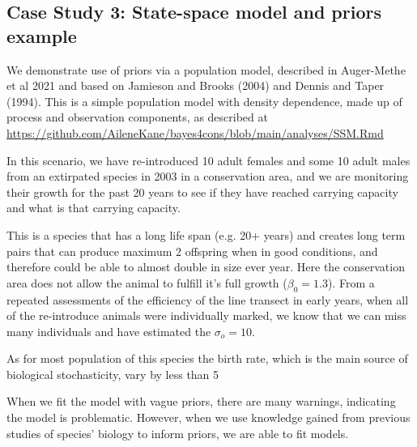 \documentclass{article}
\begin{document}
\subsection*{Case Study 3: State-space model and priors example}
\par We demonstrate use of priors via a population model, described in Auger-Methe et al 2021 and based on Jamieson and Brooks (2004) and Dennis and Taper (1994). This is a simple population model with density dependence, made up of process and observation components, as described at \href{https://github.com/AileneKane/bayes4cons/blob/main/analyses/SSM.Rmd}{https://github.com/AileneKane/bayes4cons/blob/main/analyses/SSM.Rmd}

\par In this scenario, we have re-introduced 10 adult females and some 10 adult males from an extirpated species in 2003 in a conservation area, and we are monitoring their growth for the past 20 years to see if they have reached carrying capacity and what is that carrying capacity.

\par This is a species that has a long life span (e.g. 20+ years) and creates long term pairs  that can produce maximum 2 offspring when in good conditions, and therefore could be able to almost double in size ever year. Here the conservation area does not allow the animal to fulfill it's full growth ($\beta_0 = 1.3$). From a repeated assessments of the efficiency of the line transect in early years, when all of the re-introduce animals were individually marked, we know that we can miss many individuals and have estimated the $\sigma_o = 10$.

\par As for most population of this species the birth rate, which is the main source of biological stochasticity, vary by less than 5%

\par When we fit the model with vague priors, there are many warnings, indicating the model is problematic. However, when we use knowledge gained from previous studies of species' biology to inform priors, we are able to fit models.
\end{document}

